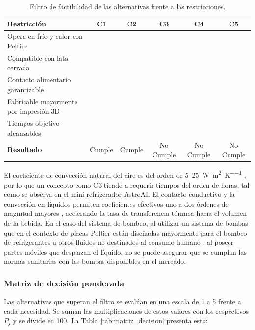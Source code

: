 \documentclass[12pt, a4paper]{article}
\newcommand{\cmark}{\checkmark} %
\newcommand{\xmark}{\ding{55}}     %
\begin{document}
\begin{table}[H]
\centering
\small
\begin{tabular}{lccccc}
\toprule
\textbf{Restricción} & \textbf{C1} & \textbf{C2} & \textbf{C3} & \textbf{C4} & \textbf{C5} \\
\midrule
Opera en frío y calor con Peltier         & \cmark & \cmark & \cmark & \cmark & \cmark \\
Compatible con lata cerrada               & \cmark & \cmark & \cmark & \cmark & \cmark \\
Contacto alimentario garantizable         & \cmark & \cmark & \cmark & \cmark & \xmark \\ 
Fabricable mayormente por impresión 3D    & \cmark & \cmark & \cmark & \xmark & \xmark \\
Tiempos objetivo alcanzables              & \cmark & \cmark & \xmark & \cmark & \cmark \\ 
\midrule
\textbf{Resultado}                        & Cumple & Cumple & No Cumple & No Cumple & No Cumple \\
\bottomrule
\end{tabular}
\caption{Filtro de factibilidad de las alternativas frente a las restricciones.}
\label{tab:filtro}
\end{table}

El coeficiente de convección natural del aire es del orden de 5--25~\si{\watt\per\square\metre\per\kelvin} \parencite{incropera2007}, por lo que un concepto como C3 tiende a requerir tiempos del orden de horas, tal como se observa en el mini refrigerador AstroAI. El contacto conductivo y la convección en líquidos permiten coeficientes efectivos uno a dos órdenes de magnitud mayores \parencite{incropera2007}, acelerando la tasa de transferencia térmica hacia el volumen de la bebida.
En el caso del sistema de bombeo, al utilizar un sistema de bombas que en el contexto de placas Peltier están diseñadas mayormente para el bombeo de refrigerantes u otros fluidos no destinados al consumo humano \parencite{bomba_dc12v_2026}, al poseer partes móviles que desplazan el líquido, no se puede asegurar que se cumplan las normas sanitarias con las bombas disponibles en el mercado.

\subsubsection{Matriz de decisión ponderada}
Las alternativas que superan el filtro se evalúan en una escala de 1 a 5 frente a cada necesidad. Se suman las multiplicaciones de estos valores con los respectivos $P_j$ y se divide en 100. La Tabla \ref{tab:matriz_decision} presenta esto:
\end{document}
